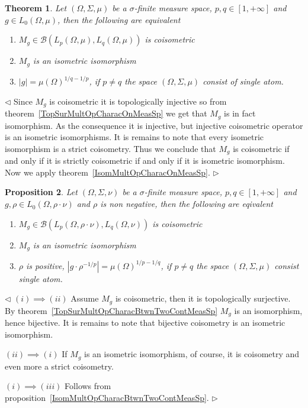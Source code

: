 \documentclass[12pt]{article}
\newtheorem{theorem}{Theorem}[subsection]
\newtheorem{proposition}[theorem]{Proposition}
\newenvironment{proof}{\par $\triangleleft$}{$\triangleright$}
\begin{document}
\begin{theorem}\label{CoisomMultOpCharacOnMeasSp}
    Let $(\Omega,\Sigma,\mu)$ be a $\sigma$-finite measure space,
    $p,q\in[1,+\infty]$ and $g\in L_0(\Omega,\mu)$, then the
    following are equivalent
    \begin{enumerate}[label = (\roman*)]
        \item $M_g\in\mathcal{B}(L_p(\Omega,\mu),L_q(\Omega,\mu))$
              is coisometric

        \item $M_g$ is an isometric isomorphism

        \item $|g|={\mu(\Omega)}^{1/q-1/p}$, if $p\neq q$ the space
              $(\Omega,\Sigma,\mu)$ consist of single atom.
    \end{enumerate}
\end{theorem}
\begin{proof} Since $M_g$ is coisometric it is topologically injective so from
    theorem~\ref{TopSurMultOpCharacOnMeasSp} we get that $M_g$ is in fact
    isomorphism. As the consequence it is injective, but injective coisometric
    operator is an isometric isomorphisms. It is remains to note that every
    isometric isomorphism is a strict coisometry. Thus we conclude that $M_g$
    is coisometric if and only if it is strictly coisometric if and only if it
    is isometric isomorphism. Now we apply
    theorem~\ref{IsomMultOpCharacOnMeasSp}.
\end{proof}

\begin{proposition}\label{CoisomMultOpCharacBtwnTwoContMeasSp}
    Let $(\Omega,\Sigma,\nu)$ be a $\sigma$-finite measure space,
    $p,q\in[1,+\infty]$ and $g,\rho\in L_0(\Omega,\rho\cdot\nu)$ and $\rho$ is
    non negative, then the following are eqivalent
    \begin{enumerate}[label = (\roman*)]
        \item $M_g\in\mathcal{B}(L_p(\Omega,\rho\cdot\nu),L_q(\Omega,\nu))$
              is coisometric

        \item $M_g$ is an isometric isomorphism

        \item $\rho$ is positive,
              $|g\cdot \rho^{-1/p}|={\mu(\Omega)}^{1/p-1/q}$, if $p\neq q$ 
              the space $(\Omega,\Sigma,\mu)$ consist single atom.
    \end{enumerate}
\end{proposition}
\begin{proof} $(i)\implies (ii)$ Assume $M_g$ is coisometric, then it is
    topologically surjective. By
    theorem~\ref{TopSurMultOpCharacBtwnTwoContMeasSp} $M_g$ is an isomorphism,
    hence bijective. It is remains to note that bijective coisometry is an
    isometric isomorphism.

    $(ii)\implies (i)$ If $M_g$ is an isometric isomorphism, of course, it is
    coisometry and even more a strict coisometry.

    $(i)\implies (iii)$ Follows from
    proposition~\ref{IsomMultOpCharacBtwnTwoContMeasSp}.
\end{proof}
\end{document}
